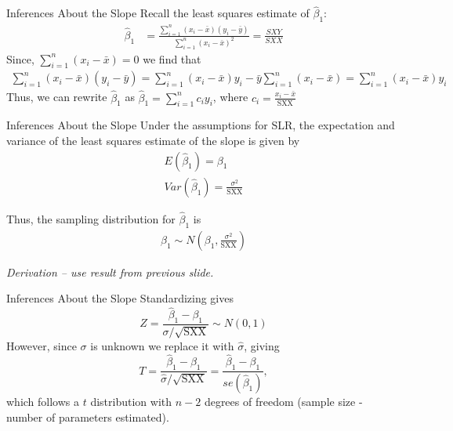\documentclass[10pt]{beamer}
\begin{document}
\begin{frame}{Inferences About the Slope}
Recall the least squares estimate of $\hat{\beta}_1$:
\begin{align*}
\hat{\beta}_1 &= \frac{\sum_{i=1}^n (x_i - \bar{x})(y_i - \bar{y})}{\sum_{i=1}^n (x_i - \bar{x})^2} = \frac{SXY}{SXX} 
\end{align*}
Since, $\sum_{i=1}^n (x_i - \bar{x}) = 0$ we find that
\begin{align*}
\sum_{i=1}^n (x_i - \bar{x})(y_i - \bar{y}) = \sum_{i=1}^n (x_i - \bar{x})y_i - \bar{y} \sum_{i=1}^n (x_i - \bar{x}) = \sum_{i=1}^n (x_i - \bar{x}) y_i
\end{align*}
Thus, we can rewrite $\hat{\beta}_1$ as
$\hat{\beta}_1 = \sum_{i=1}^n c_i y_i$, where $c_i = \frac{x_i - \bar{x}}{\text{SXX}}$
\end{frame}

\begin{frame}{Inferences About the Slope}
Under the assumptions for SLR, the expectation and variance of the least squares estimate of the slope is given by
\begin{align*}
E(\hat{\beta}_1) = \beta_1\\
Var(\hat{\beta}_1) = \frac{\sigma^2}{\text{SXX}}
\end{align*}

Thus, the sampling distribution for $\hat{\beta}_1$ is
\begin{align*}
\hat{\beta}_1 \sim N(\beta_1, \frac{\sigma^2}{\text{SXX}})
\end{align*}
\vspace{10pt}

\emph{Derivation -- use result from previous slide.}
\end{frame}

\begin{frame}{Inferences About the Slope}
Standardizing gives
$$Z = \frac{\hat{\beta}_1 - \beta_1}{\sigma / \sqrt{\text{SXX}}} \sim N(0,1)$$
However, since $\sigma$ is unknown we replace it with $\hat{\sigma}$, giving
$$T = \frac{\hat{\beta}_1 - \beta_1}{\hat{\sigma} / \sqrt{\text{SXX}}} = \frac{\hat{\beta}_1 - \beta_1}{se(\hat{\beta}_1)},$$
which follows a $t$ distribution with $n-2$ degrees of freedom (sample size - number of parameters estimated).
\end{frame}
\end{document}
